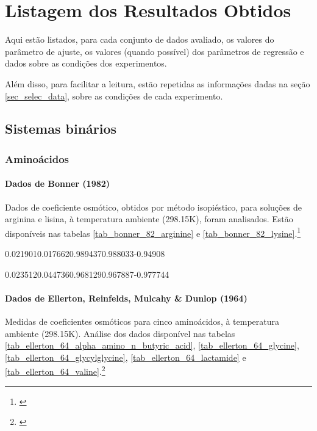 \partanexos

\chapter{Listagem dos Resultados Obtidos}

Aqui estão listados, para cada conjunto de dados avaliado, os valores do
parâmetro de ajuste, os valores (quando possível) dos parâmetros
de regressão e dados sobre as condições dos experimentos.

Além disso, para facilitar a leitura, estão repetidas as informações
dadas na seção \ref{sec_selec_data}, sobre as condições de cada experimento.

\section{Sistemas binários}

\subsection{Aminoácidos}

\subsubsection{Dados de Bonner (1982)}

Dados de coeficiente osmótico, obtidos por método isopiéstico, para
soluções de arginina e lisina, à temperatura ambiente (298.15K), foram
analisados. Estão disponíveis nas tabelas \ref{tab_bonner_82_arginine} e
\ref{tab_bonner_82_lysine}.\footnote{\cite{bonner1982}}

%
	{0.021901}{0.017662}{0.989437}{0.988033}{-0.94908}

%
	{0.023512}{0.044736}{0.968129}{0.967887}{-0.977744}

\FloatBarrier

\subsubsection{Dados de Ellerton, Reinfelds, Mulcahy \& Dunlop (1964)}

Medidas de coeficientes osmóticos para cinco aminoácidos, à temperatura ambiente
(298.15K). Análise dos dados disponível nas tabelas
\ref{tab_ellerton_64_alpha_amino_n_butyric_acid}, \ref{tab_ellerton_64_glycine},
\ref{tab_ellerton_64_glycylglycine}, \ref{tab_ellerton_64_lactamide} e
\ref{tab_ellerton_64_valine}.\footnote{\cite{ellerton1964}}

